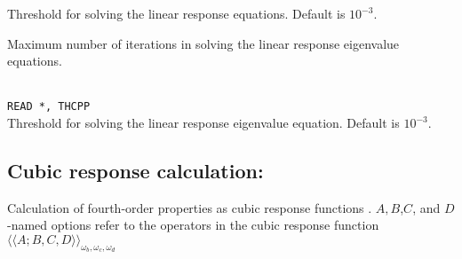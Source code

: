 \begin{description}
\item{}
Threshold for solving the linear response equations.
Default is $10^{-3}$.

\item{}
Maximum number of iterations in solving the linear
response eigenvalue 
equations.

\item{}\\
\verb|READ *, THCPP|\\
Threshold for solving the linear response eigenvalue equation. 
Default is $10^{-3}$.

\end{description}

\subsection{Cubic response calculation: }
Calculation of fourth-order properties as cubic response
functions 
\cite{pndjovhacpl242,djpnhajcp105,pndjhapdkrthhkcpl253}.
$A,B$,$C$, and $D$-named options refer to the operators in the cubic
response function 
$\langle\!\langle A;B,C,D \rangle\!\rangle_{\omega_b,\omega_c,\omega_d}$

